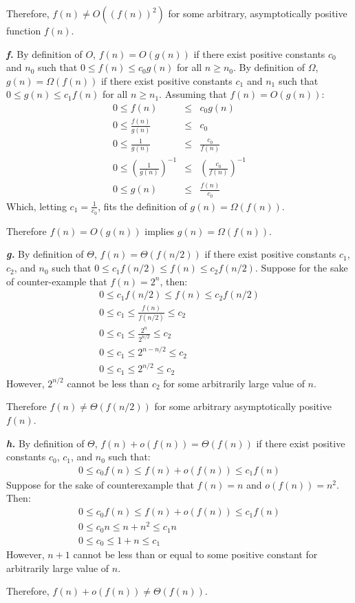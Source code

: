 \documentclass{article}
\begin{document}
Therefore, $f(n) \neq O((f(n))^2)$ for some arbitrary, asymptotically positive function $f(n)$.

\noindent\textbf{\textit{f.}} By definition of $O$, $f(n) = O(g(n))$ if there exist positive constants $c_0$ and $n_0$ such that $0 \leq f(n) \leq c_0 g(n)$ for all $n \geq n_0$. By definition of $\Omega$, $g(n) = \Omega(f(n))$ if there exist positive constants $c_1$ and $n_1$ such that $0 \leq g(n) \leq c_1 f(n)$ for all $n \geq n_1$. Assuming that $f(n) = O(g(n))$:
\begin{eqnarray*}
	0 \leq f(n) & \leq & c_0 g(n) \\
	0 \leq \frac{f(n)}{g(n)} & \leq & c_0 \\
	0 \leq \frac{1}{g(n)} & \leq & \frac{c_0}{f(n)} \\
	0 \leq \left ( \frac{1}{g(n)} \right )^{-1} & \leq & \left ( \frac{c_0}{f(n)} \right )^{-1} \\
	0 \leq g(n) & \leq & \frac{f(n)}{c_0}
\end{eqnarray*}
Which, letting $c_1 = \frac{1}{c_0}$, fits the definition of $g(n) = \Omega(f(n))$.

Therefore $f(n) = O(g(n))$ implies $g(n) = \Omega(f(n))$.

\noindent\textbf{\textit{g.}} By definition of $\Theta$, $f(n) = \Theta(f(n/2))$ if there exist positive constants $c_1$, $c_2$, and $n_0$ such that $0 \leq c_1 f(n/2) \leq f(n) \leq c_2 f(n/2)$. Suppose for the sake of counter-example that $f(n) = 2^n$, then:
\begin{eqnarray*}
	0 \leq c_1 f(n/2) \leq f(n) \leq c_2 f(n/2) \\
	0 \leq c_1 \leq \frac{f(n)}{f(n/2)} \leq c_2 \\
	0 \leq c_1 \leq \frac{2^n}{2^{n/2}} \leq c_2 \\
	0 \leq c_1 \leq 2^{n - n/2} \leq c_2 \\
	0 \leq c_1 \leq 2^{n/2} \leq c_2
\end{eqnarray*}
However, $2^{n/2}$ cannot be less than $c_2$ for some arbitrarily large value of $n$.

Therefore $f(n) \neq \Theta(f(n/2))$ for some arbitrary asymptotically positive $f(n)$.

\noindent\textbf{\textit{h.}} By definition of $\Theta$, $f(n) + o(f(n)) = \Theta(f(n))$ if there exist positive constants $c_0$, $c_1$, and $n_0$ such that:
\begin{eqnarray*}
	0 \leq c_0 f(n) \leq f(n) + o(f(n)) \leq c_1 f(n)
\end{eqnarray*}
Suppose for the sake of counterexample that $f(n) = n$ and $o(f(n)) = n^2$. Then:
\begin{eqnarray*}
	0 \leq c_0 f(n) \leq f(n) + o(f(n)) \leq c_1 f(n) \\
	0 \leq c_0 n \leq n + n^2 \leq c_1 n \\
	0 \leq c_0 \leq 1 + n \leq c_1
\end{eqnarray*}
However, $n + 1$ cannot be less than or equal to some positive constant for arbitrarily large value of $n$.

Therefore, $f(n) + o(f(n)) \neq \Theta(f(n))$.
\end{document}
